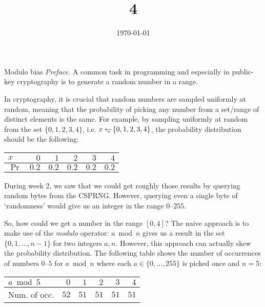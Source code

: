 \documentclass{practice}
\title{4}
\date{\today}
\newcommand*{\getsu}{\gets_{\scriptscriptstyle \hspace*{-0.65em} u\hspace*{0.0em}}}
\begin{document}
\maketitle

\begin{task}{Modulo bias}
  \textit{Preface.}
  A common task in programming and especially in public-key cryptography is to generate a random number in a range.

  In cryptography, it is crucial that random numbers are sampled uniformly at random, meaning that the probability of picking any number from a set/range of distinct elements is the same.
  For example, by sampling uniformly at random from the set $\{0, 1, 2, 3, 4\}$, i.e. $x\getsu\{0, 1, 2, 3, 4\}$, the probability distribution should be the following:
  \begin{center}
    \begin{tabular}{l r r r r r}
      \hline
      $x$ & $0$ & $1$ & $2$ & $3$ & $4$\\
      \hline
      $\Pr$ & $0.2$ & $0.2$ & $0.2$ & $0.2$ & $0.2$\\
      \hline
    \end{tabular}
  \end{center}

  During week 2, we saw that we could get roughly those results by querying random bytes from the CSPRNG.
  However, querying even a single byte of `randomness' would give us an integer in the range $0$--$255$.

  \iffalse
  In general, getting a random number in the range $[0, 2^n - 1]$ is `easy' since then we could just bit-mask the bytes gotten from the CSPRNG.
  For example, if we want a random number in the range $[0, 7]$, we simply need to isolate the first three bits of a random byte: \texttt{0b111} is $7$.
  \fi

  So, how could we get a number in the range $[0, 4]$?
  The naive approach is to make use of the \emph{modulo} operator: $a \bmod n$ gives us a result in the set $\{0, 1, \dots, n-1\}$ for two integers $a, n$.
  However, this approach can actually skew the probability distribution.
  The following table shows the number of occurrences of numbers $0$--$5$ for $a \bmod n$ where each $a\in\{0, \dots, 255\}$ is picked once and $n = 5$:
  \begin{center}
    \begin{tabular}{l r r r r r}
      \hline
      $a \bmod 5$ & $0$ & $1$ & $2$ & $3$ & $4$\\
      \hline
      Num. of occ. & $52$ & $51$ & $51$ & $51$ & $51$\\
      \hline
    \end{tabular}
  \end{center}


\end{task}
\end{document}
